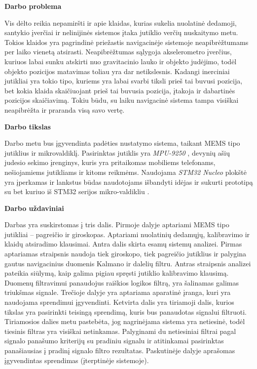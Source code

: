 \textbf{Darbo problema}

Vis dėlto reikia nepamiršti ir apie klaidas, kurias sukelia nuolatinė dedamoji, santykio įverčiai ir nelinijinės sistemos įtaka jutiklio verčių nuskaitymo metu.
Tokios klaidos yra pagrindinė priežastis navigacinėje sistemoje neapibrėžtumams per laiko vienetą atsirasti. 
Neapibrėžtumas sąlygoja akselerometro įverčius, kuriuos labai sunku atskirti nuo gravitacinio lauko ir objekto judėjimo, todėl objekto pozicijos matavimas toliau yra dar netikslesnis. 
Kadangi inerciniai jutikliai yra tokio tipo, kuriems yra labai svarbi tiksli prieš tai buvusi pozicija, bet kokia klaida skaičiuojant prieš tai buvusia pozicija, įtakoja ir dabartinės pozicijos skaičiavimą. 
Tokiu būdu, su laiku navigacinė sistema tampa visiškai neapibrėžta ir praranda visą savo vertę.

\textbf{Darbo tikslas}

Darbo metu bus įgyvendinta padėties nustatymo sistema, taikant MEMS tipo jutiklius ir mikrovaldiklį.
Pasirinktas jutiklis yra \textit{MPU-9250} \cite{MPU-96:online}, devynių ašių judesio sekimo įrenginys, kuris yra pritaikomas mobiliems telefonams, nešiojamiems jutikliams ir kitoms reikmėms.
Naudojama \textit{STM32 Nucleo} plokštė yra įperkamas ir lankstus būdas naudotojams išbandyti idėjas ir sukurti prototipą su bet kuriuo iš STM32 serijos mikro-valdikliu \cite{STM3258:online}.

\textbf{Darbo uždaviniai}

Darbas yra suskirstomas į tris dalis. 
Pirmoje dalyje aptariami MEMS tipo jutikliai -- pagreičio ir giroskopas. 
Aptariami nuolatinių dedamųjų, kalibravimo ir klaidų atsiradimo klausimai. 
Antra dalis skirta esamų sistemų analizei. 
Pirmas aptariamas straipsnis \cite{willemsenconcept} naudoja tiek giroskopo, tiek pagreičio jutiklius ir palygina gautus navigacinius duomenis Kalmano ir dalelių filtru. 
Antras straipsnis \cite{yoo2011fuzzy} analizei pateikia siūlymą, kaip galima pigiau spręsti jutiklio kalibravimo klausimą.
Duomenų filtravimui panaudojus raiškios logikos filtrą, yra šalinamas galimas triukšmas signale.
Trečioje dalyje yra aptariama aparatinė įranga, kuri yra naudojama sprendimui įgyvendinti.
Ketvirta dalis yra tiriamoji dalis, kurios tikslas yra pasirinkti teisingą sprendimą, kuris bus panaudotas signalui filtruoti.
Tiriamosios dalies metu pastebėta, jog nagrinėjama sistema yra netiesinė, todėl tiesinis filtras yra visiškai netinkamas.
Palyginami du netiesiniai filtrai pagal signalo panašumo kriterijų su pradiniu signalu ir atitinkamai pasirinktas panašiausias į pradinį signalo filtro rezultatas.
Paskutinėje dalyje aprašomas įgyvendintas sprendimas (įterptinėje sistemoje).